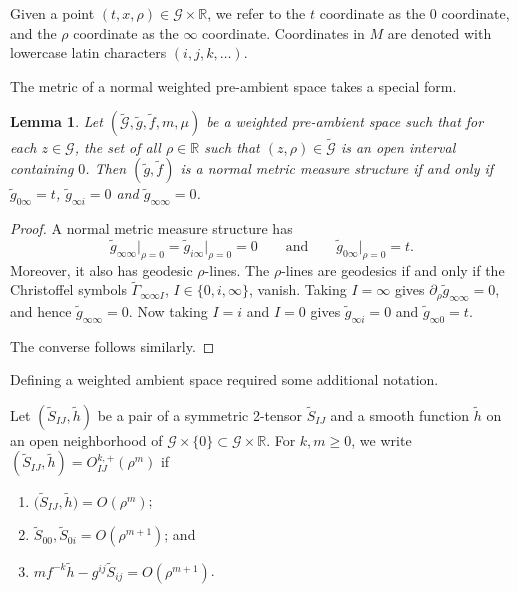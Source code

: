 \documentclass[10pt,a4paper]{amsart}
\newcommand{\cg}{\widetilde{g}}
\newcommand{\cf}{\widetilde{f}}
\newcommand{\cmG}{\widetilde{\mathcal{G}}}
\newcommand{\mG}{\mathcal{G}}
\newcommand{\bR}{\mathbb{R}}
\numberwithin{equation}{section}
\newtheorem{Lemma}[Theorem]{Lemma}
\begin{document}
Given a point $(t,x,\rho)\in \mathcal{G}\times \bR$, we refer to the $t$ coordinate as the $0$ coordinate, and the $\rho$ coordinate as the $\infty$ coordinate. Coordinates in $M$ are denoted with lowercase latin characters $(i,j,k,\dots)$.

The metric of a normal weighted pre-ambient space takes a special form.

\begin{Lemma}
\label{straight-metric-lemma}
Let $(\cmG,\cg,\cf,m,\mu)$ be a weighted pre-ambient space such that for each $z\in\mG$, the set of all $\rho\in\bR$ such that $(z,\rho)\in\cmG$ is an open interval containing $0$. Then $(\cg,\cf)$ is a \textit{normal} metric measure structure if and only if $\cg_{0\infty}=t$, $\cg_{\infty i}=0$ and $\cg_{\infty\infty}=0$.
\end{Lemma}

\begin{proof}
A normal metric measure structure has
\[
\widetilde{g}_{\infty\infty}\big|_{\rho=0}=\widetilde{g}_{i\infty}\big|_{\rho=0}=0 \qquad\text{and}\qquad \widetilde{g}_{0\infty}\big|_{\rho=0}=t.
\]
Moreover, it also has geodesic $\rho$-lines. The $\rho$-lines are geodesics if and only if the Christoffel symbols $\widetilde{\Gamma}_{\infty \infty I}$, $I\in \{0,i,\infty\}$, vanish. Taking $I=\infty$ gives $\partial_{\rho} \widetilde{g}_{\infty \infty}=0$, and hence $\widetilde{g}_{\infty \infty}=0 .$ Now taking $I=i$ and $I=0$ gives $\widetilde{g}_{\infty i}=0$ and $\widetilde{g}_{\infty 0}=t$.

The converse follows similarly.
\end{proof}
Defining a weighted ambient space required some additional notation.

\begin{Definition}
Let $(\widetilde{S}_{IJ},\widetilde{h})$ be a pair of a symmetric 2-tensor $\widetilde{S}_{IJ}$ and a smooth function $\widetilde{h}$ on an open neighborhood of $\mathcal{G}\times \{0\}\subset\mathcal{G}\times \bR$. For $k,m\geq 0$, we write $(\widetilde{S}_{IJ},\widetilde{h})=O_{IJ}^{k,+}(\rho^m)$ if
\begin{enumerate}[label=$(\roman*)$]\itemsep=0pt
\item $\big(\widetilde{S}_{IJ},\widetilde{h}\big)=O(\rho^{m})$;
\item $\widetilde{S}_{00},\widetilde{S}_{0i}=O(\rho^{m+1})$; and
\item $m f^{-k}\widetilde{h}-g^{ij}\widetilde{S}_{ij}= O(\rho^{m+1})$.
\end{enumerate}
\end{Definition}
\end{document}
